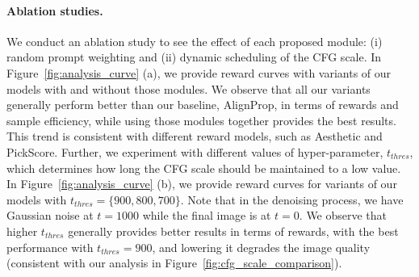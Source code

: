 \paragraph{Ablation studies.}
We conduct an ablation study to see the effect of each proposed module: (i) random prompt weighting and (ii) dynamic scheduling of the CFG scale. In Figure~\ref{fig:analysis_curve} (a), we provide reward curves with variants of our models with and without those modules. We observe that all our variants generally perform better than our baseline, AlignProp, in terms of rewards and sample efficiency, while using those modules together provides the best results. This trend is consistent with different reward models, such as Aesthetic and PickScore. Further, we experiment with different values of hyper-parameter, $t_{thres}$, which determines how long the CFG scale should be maintained to a low value. In Figure~\ref{fig:analysis_curve} (b), we provide reward curves for variants of our models with $t_{thres}=\{900, 800, 700\}$. Note that in the denoising process, we have Gaussian noise at $t=1000$ while the final image is at $t=0$. We observe that higher $t_{thres}$ generally provides better results in terms of rewards, with the best performance with $t_{thres}=900$, and lowering it degrades the image quality (consistent with our analysis in Figure~\ref{fig:cfg_scale_comparison}). 
